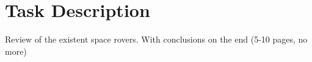\section{Task Description}

Review of the existent space rovers. With conclusions on the end (5-10 pages,
no more)